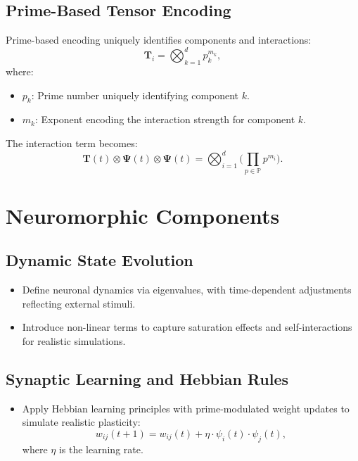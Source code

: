 \documentclass{article}
\theoremstyle{plain}
\begin{document}
\begin{itemize}
\begin{itemize}
\subsection{Prime-Based Tensor Encoding}
Prime-based encoding uniquely identifies components and interactions:
\begin{equation}
\bm{T}_i = \bigotimes_{k=1}^d p_k^{m_k},
\end{equation}
where:
\begin{itemize}
    \item \(p_k\): Prime number uniquely identifying component \(k\).
    \item \(m_k\): Exponent encoding the interaction strength for component \(k\).
\end{itemize}
The interaction term becomes:
\begin{equation}
\bm{T}(t) \otimes \bm{\Psi}(t) \otimes \bm{\Psi}(t) = \bigotimes_{i=1}^d \bigg( \prod_{p \in \mathbb{P}} p^{m_i} \bigg).
\end{equation}

\section{Neuromorphic Components}

\subsection{Dynamic State Evolution}
\begin{itemize}
    \item Define neuronal dynamics via eigenvalues, with time-dependent adjustments reflecting external stimuli.
    \item Introduce non-linear terms to capture saturation effects and self-interactions for realistic simulations.
\end{itemize}

\subsection{Synaptic Learning and Hebbian Rules}
\begin{itemize}
    \item Apply Hebbian learning principles with prime-modulated weight updates to simulate realistic plasticity:
    \[
    w_{ij}(t+1) = w_{ij}(t) + \eta \cdot \psi_i(t) \cdot \psi_j(t),
    \]
    where \(\eta\) is the learning rate.
\end{itemize}


\end{itemize}
\end{itemize}
\end{document}
